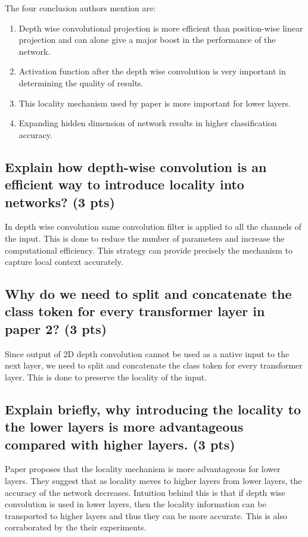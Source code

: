 \documentclass{article}
\begin{document}
The four conclusion authors mention are:
\begin{enumerate}
    \item Depth wise convolutional projection is more efficient than position-wise linear projection and can alone give a major boost in the performance of the network.
    \item Activation function after the depth wise convolution is very important in determining the quality of results.
    \item This locality mechanism used by paper is more important for lower layers.
    \item Expanding hidden dimension of network results in higher classification accuracy.
\end{enumerate}

\subsection{Explain how depth-wise convolution is an efficient way to introduce locality into networks? (3 pts)}

In depth wise convolution same convolution filter is applied to all the channels of the input. This is done to reduce the number of parameters and increase the computational efficiency. This strategy can provide precisely the mechanism to capture local context accurately.

\subsection{Why do we need to split and concatenate the class token for every transformer layer in paper 2? (3 pts)}

Since output of 2D depth convolution cannot be used as a native input to the next layer, we need to split and concatenate the class token for every transformer layer. This is done to preserve the locality of the input.

\subsection{Explain briefly, why introducing the locality to the lower layers is more advantageous compared with higher layers. (3 pts)}

Paper proposes that the locality mechanism is more advantageous for lower layers. They suggest that as locality meves to higher layers from lower layers, the accuracy of the network decreases. Intuition behind this is that if depth wise convolution is used in lower layers, then the locality information can be transported to higher layers and thus they can be more accurate. This is also corraborated by the their experiments.
\end{document}
